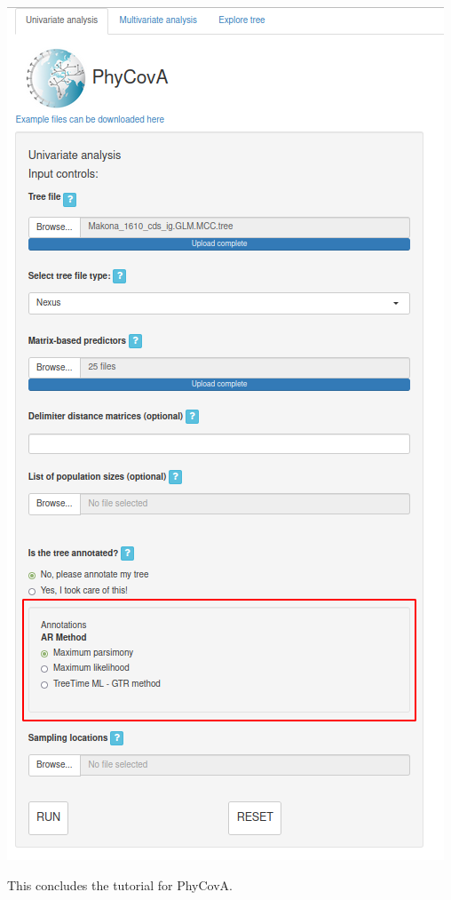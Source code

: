 \documentclass[
]{article}
\begin{document}
\includegraphics{tutorial_img/Non_annotated.png}

This concludes the tutorial for PhyCovA.
\end{document}
